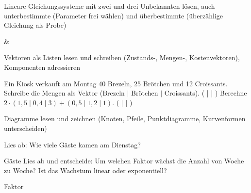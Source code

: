\setcounter{aufgabe}{0}

\begin{aufgabe}{Lineare Gleichungssysteme mit zwei und drei Unbekannten lösen, auch unterbestimmte (Parameter frei wählen) und überbestimmte (überzählige Gleichung als Probe)}
\begin{gleichungsraster}[2]
 &
 \\
\end{gleichungsraster}
\end{aufgabe}

\begin{aufgabe}{Vektoren als Listen lesen und schreiben (Zustands-, Mengen-, Kostenvektoren), Komponenten adressieren}
\begin{teile}
\teil Ein Kiosk verkauft am Montag 40 Brezeln, 25 Brötchen und 12 Croissants. Schreibe die Mengen als Vektor (Brezeln $\mid$ Brötchen $\mid$ Croissants). ( \leerfeld | \leerfeld | \leerfeld )
\teil Berechne $2 \cdot (1{,}5 \mid 0{,}4 \mid 3) + (0{,}5 \mid 1{,}2 \mid 1)$. ( \leerfeld | \leerfeld | \leerfeld )
\end{teile}
\end{aufgabe}

\begin{aufgabe}{Diagramme lesen und zeichnen (Knoten, Pfeile, Punktdiagramme, Kurvenformen unterscheiden)}
\begin{teile}
\teil Lies ab: Wie viele Gäste kamen am Dienstag?

\leerfeld Gäste
\teil Lies ab und entscheide: Um welchen Faktor wächst die Anzahl von Woche zu Woche? Ist das Wachstum linear oder exponentiell?

Faktor \leerfeld
\end{teile}
\end{aufgabe}

